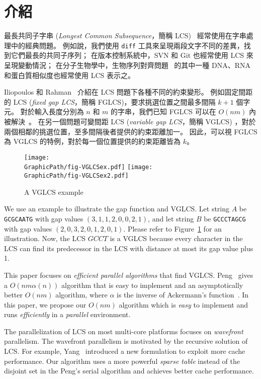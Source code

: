 \section{介紹} %
\label{sec:Introduction}

最長共同子字串 ({\em Longest Common Subsequence}，簡稱 LCS)~
\cite{Hirschberg1975ALS} 經常使用在字串處理中的經典問題。
例如說，我們使用 {\tt diff} 工具來呈現兩段文字不同的差異，找到它們最長的共同子序列；
在版本控制系統中，SVN 和 Git 也經常使用 LCS 來呈現變動情況；
在分子生物學中，生物序列對齊問題~\cite{mount2001bioinformatics,
Ann2010EfficientAF} 的其中一種 DNA、RNA 和蛋白質相似度也經常使用 LCS 表示之。

Iliopoulos 和 Rahman~\cite{Rahman2006AlgorithmsFC} 介紹在 LCS 問題下各種不同的約束變形。
例如固定間距的 LCS ({\em fixed gap LCS}，簡稱 FGLCS)，要求挑選位置之間最多間隔 $k+1$ 個字元。
對於輸入長度分別為 $n$ 和 $m$ 的字串，我們已知 FGLCS 可以在 $O(nm)$ 內被解決~\cite{Rahman2006AlgorithmsFC}。
在另一個問題可變間距 LCS ({\em variable gap LCS}，簡稱 VGLCS)
，對於兩個相鄰的挑選位置，至多間隔後者提供的約束距離加一。
因此，可以視 FGLCS 為 VGLCS 的特例，對於每一個位置提供的約束距離皆為 $k$。

\begin{figure}[!thb]
  \centering
  \texttt{[image: \\GraphicPath/fig-VGLCSex.pdf]}
  \texttt{[image: \\GraphicPath/fig-VGLCSex2.pdf]}
  \caption{A VGLCS example} \label{fig:VGLCSex}
\end{figure}

We use an example to illustrate the gap function and VGLCS.  Let string
$A$ be {\tt GCGCAATG} with gap values $(3, 1, 1, 2, 0, 0, 2, 1)$, and
let string $B$ be {\tt GCCCTAGCG} with gap values $(2, 0, 3, 2, 0, 1, 2,
0, 1)$.  Please refer to Figure~\ref{fig:VGLCSex} for an illustration.
Now, the LCS $GCCT$ is a VGLCS because every character in the LCS can
find its predecessor in the LCS with distance at most its gap value plus
1.

This paper focuses on {\em efficient parallel algorithms} that find
VGLCS.  Peng~\cite{Peng2011TheLC} gives a $O(nm \alpha(n))$ algorithm
that is easy to implement and an asymptotically better $O(nm)$
algorithm, where $\alpha$ is the inverse of Ackermann's
function~\cite{Banachowski1980ACT}.  In this paper, we propose our
$O(nm)$ algorithm which is {\em easy} to implement and runs {\em
efficiently} in a {\em parallel} environment.

The parallelization of LCS on most multi-core platforms focuses on
{\em wavefront} parallelism.  The wavefront parallelism is motivated
by the recursive solution of LCS.  For example,
Yang~\cite{Yang2010AnEP} introduced a new formulation to exploit more
cache performance.  Our algorithm uses a more powerful {\em sparse
  table} instead of the disjoint set in the Peng's serial algorithm
and achieves better cache performance.

